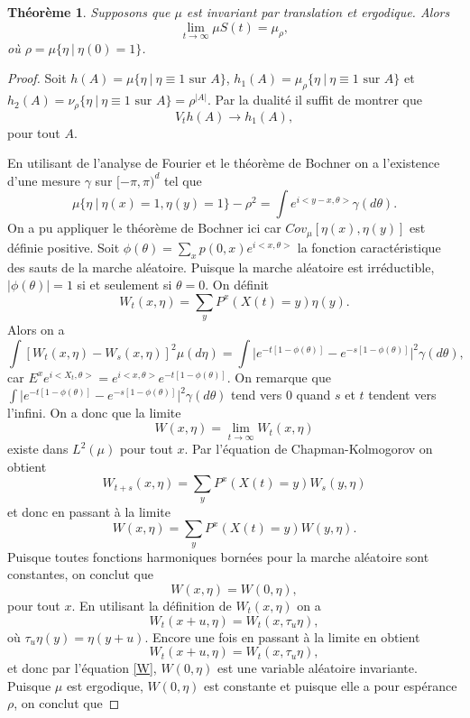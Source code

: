 \documentclass[a4paper,11pt]{article}
\theoremstyle{break}
\theoremstyle{break}
\newtheorem{theorem}{Théorème}[section]
\theoremstyle{definition}
\theoremstyle{remark}
\begin{document}
\begin{theorem}
Supposons que $\mu$ est invariant par translation et ergodique. Alors 
$$
\lim_{t\rightarrow\infty} \mu S(t) =\mu_\rho,
$$
où $\rho=\mu\{ \eta \ \vert \ \eta (0) =1\}$.
\end{theorem}
\begin{proof}
Soit $h(A)=\mu\{ \eta \ \vert \ \eta \equiv 1\text{ sur } A\}$, $h_1(A)=\mu_\rho\{ \eta \ \vert \ \eta \equiv 1\text{ sur } A\}$ et $h_2(A)=\nu_\rho\{ \eta \ \vert \ \eta \equiv 1\text{ sur } A\}=\rho^{\vert A\vert}.$ Par la dualité il suffit de montrer que 
$$
V_t h(A)\rightarrow h_1(A),
$$
pour tout $A$.

En utilisant de l'analyse de Fourier et le théorème de Bochner on a l'existence d'une mesure $\gamma$ sur $[-\pi , \pi)^d$ tel que 
$$
\mu\{ \eta \ \vert \ \eta (x) =1, \eta (y) =1\}-\rho^2 =\int e^{i<y-x,\theta>}\gamma (d \theta).
$$
On a pu appliquer le théorème de Bochner ici car $Cov_\mu[\eta(x),\eta(y)]$ est définie positive.
Soit $\phi (\theta ) =\sum\limits_x p(0,x) e^{i<x,\theta >}$ la fonction caractéristique des sauts de la marche aléatoire. Puisque la marche aléatoire est irréductible, $\vert \phi (\theta )\vert =1$ si et seulement si $\theta = 0$. On définit 
$$
W_t (x,\eta )=\sum\limits_y P^x (X(t)=y)\eta(y).
$$
Alors on a
$$
\int [W_t (x,\eta)-W_s (x, \eta)]^2 \mu (d\eta ) =\int \vert e^{-t[1-\phi (\theta )]}-e^{-s[1-\phi (\theta )]}\vert ^2 \gamma ( d\theta ),
$$
car $ E^x e^{i<X_t, \theta >}= e^{i<x,\theta >} e^{-t[1-\phi (\theta )]}$. On remarque que $ \int \vert e^{-t[1-\phi (\theta )]}-e^{-s[1-\phi (\theta )]}\vert ^2 \gamma ( d\theta )$ tend vers $0$ quand $s$ et $t$ tendent vers l'infini. On a donc que la limite
$$
W(x,\eta ) = \lim_{t\rightarrow\infty }W_t(x,\eta )
$$ 
existe dans $L^2 (\mu )$ pour tout $x$. Par l'équation de Chapman-Kolmogorov on obtient
$$
W_{t+s} (x,\eta )=\sum\limits_y P^x (X(t)=y)W_s (y,\eta )
$$
et donc en passant à la limite
$$
W (x,\eta )=\sum\limits_y P^x (X(t)=y)W (y,\eta ).
$$
Puisque toutes fonctions harmoniques bornées pour la marche aléatoire sont constantes, on conclut que 
\begin{equation}\label{W}
W(x,\eta ) =W (0,\eta ),
\end{equation}
pour tout $x$. En utilisant la définition de $W_t (x,\eta )$ on a
$$
W_t (x+u,\eta ) = W_t (x, \tau_u \eta),
$$
où $\tau_u \eta (y) = \eta (y + u)$. Encore une fois en passant à la limite en obtient
$$
W_t (x+u,\eta ) = W_t (x, \tau_u \eta),
$$
et donc par l'équation \eqref{W}, $W(0,\eta )$ est une variable aléatoire invariante. Puisque $\mu$ est ergodique, $W(0,\eta)$ est constante et puisque elle a pour espérance $\rho$, on conclut que

\end{proof}
\end{document}
